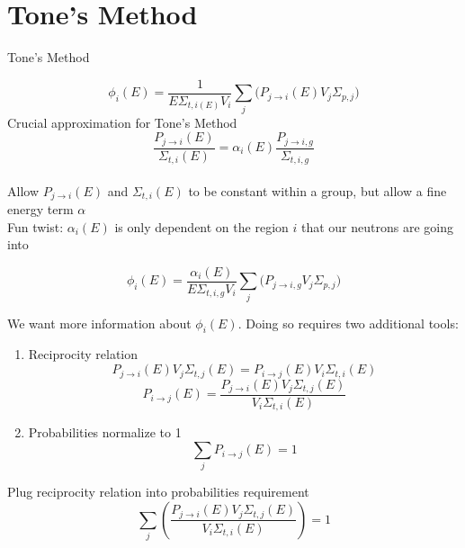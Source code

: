 \documentclass{beamer}
\begin{document}
\section{Tone's Method}
  \begin{frame}{Tone's Method}

    \begin{equation*}\phi_{i}(E)=\frac{1}{E\Sigma_{t,i(E)}V_i}\sum\limits_j\Big(P_{j\rightarrow i}(E)V_{j}\Sigma_{p,j}\Big)\end{equation*}
  Crucial approximation for Tone's Method
    \begin{equation*}\frac{P_{j\rightarrow i}(E)}{\Sigma_{t,i}(E)}=\alpha_{i}(E)\frac{P_{j\rightarrow i,g}}{\Sigma_{t,i,g}}\end{equation*}\\[4pt]
      Allow $P_{j\rightarrow i}(E)$ and $\Sigma_{t,i}(E)$ to be constant within a group, but allow a fine energy term $\alpha$\\[4pt]
    Fun twist: $\alpha_i(E)$ is only dependent on the region $i$ that our neutrons are going into

  \end{frame}
    \begin{frame}
      \begin{equation*}\phi_{i}(E)=\frac{\alpha_i(E)}{E\Sigma_{t,i,g}V_i}\sum\limits_j\Big(P_{j\rightarrow i,g}V_{j}\Sigma_{p,j}\Big)\end{equation*}

  We want more information about $\phi_i(E)$. Doing so requires two additional tools:
  \begin{enumerate}
    \item Reciprocity relation
      \begin{equation*}P_{j\rightarrow i}(E)V_{j}\Sigma_{t,j}(E)=P_{i\rightarrow j}(E)V_{i}\Sigma_{t,i}(E)\end{equation*}
        \begin{equation*}P_{i\rightarrow j}(E)=\frac{P_{j\rightarrow i}(E)V_{j}\Sigma_{t,j}(E)}{V_{i}\Sigma_{t,i}(E)}\end{equation*}
    \item Probabilities normalize to 1
      \begin{equation*}\sum\limits_{j}P_{i\rightarrow j}(E)=1\end{equation*}
  \end{enumerate}


Plug reciprocity relation into probabilities requirement
      \begin{equation*}\sum\limits_{j}\left(\frac{P_{j\rightarrow i}(E)V_{j}\Sigma_{t,j}(E)}{V_{i}\Sigma_{t,i}(E)}\right)=1\end{equation*}

    \end{frame}
\end{document}
